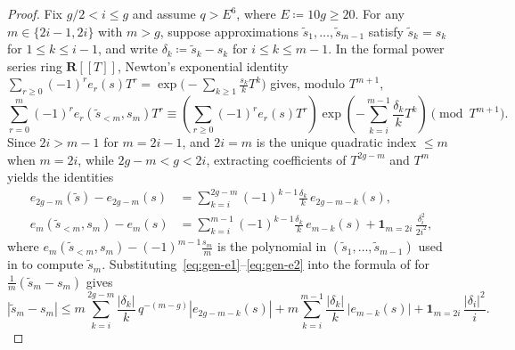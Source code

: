 \documentclass[11pt]{amsart}
\theoremstyle{remark}
\newcommand{\R}{\mathbf{R}}
\begin{document}
\begin{proof}
Fix $g/2 < i \le g$ and assume $q > E^6$, where $E \coloneqq 10g \ge 20$. For any $m \in \{2i - 1, 2i\}$ with $m > g$, suppose approximations $\tilde{s}_1, \dots, \tilde{s}_{m-1}$ satisfy $\tilde{s}_k = s_k$ for $1 \le k \le i - 1$, and write $\delta_k \coloneqq \tilde{s}_k - s_k$ for $i \le k \le m - 1$. In the formal power series ring $\R[[T]]$, Newton's exponential identity $\sum_{r \ge 0} (-1)^r e_r(s) T^r = \exp\bigl(-\sum_{k \ge 1} \frac{s_k}{k} T^k\bigr)$ gives, modulo $T^{m+1}$,
\[
\sum_{r=0}^m (-1)^r e_r(\tilde{s}_{<m}, s_m) T^r \equiv \left(\sum_{r \ge 0} (-1)^r e_r(s) T^r\right) \exp\!\left(-\sum_{k=i}^{m-1} \frac{\delta_k}{k} T^k\right) \pmod{T^{m+1}}.
\]
Since $2i > m - 1$ for $m = 2i - 1$, and $2i = m$ is the unique quadratic index $\le m$ when $m = 2i$, while $2g - m < g < 2i$, extracting coefficients of $T^{2g - m}$ and $T^m$ yields the identities
\begin{align}
e_{2g-m}(\tilde{s}) - e_{2g-m}(s) &= \sum_{k=i}^{2g-m} (-1)^{k-1} \frac{\delta_k}{k}\, e_{2g-m-k}(s), \label{eq:gen-e1}\\
e_m(\tilde{s}_{<m}, s_m) - e_m(s) &= \sum_{k=i}^{m-1} (-1)^{k-1} \frac{\delta_k}{k}\, e_{m-k}(s) + \mathbf{1}_{m=2i}\, \frac{\delta_i^2}{2 i^2}, \label{eq:gen-e2}
\end{align}
where $e_m(\tilde{s}_{<m}, s_m) - (-1)^{m-1} \frac{s_m}{m}$ is the polynomial in $(\tilde{s}_1, \dots, \tilde{s}_{m-1})$ used in \cite[Lemma~5.1]{CK26} to compute $\tilde{s}_m$. Substituting~\eqref{eq:gen-e1}--\eqref{eq:gen-e2} into the formula of \cite[Lemma~5.1]{CK26} for $\frac{1}{m}(\tilde{s}_m - s_m)$ gives
\begin{equation}\label{eq:sm-err}
|\tilde{s}_m - s_m| \le m \sum_{k=i}^{2g-m} \frac{|\delta_k|}{k}\, q^{-(m-g)} |e_{2g-m-k}(s)| + m \sum_{k=i}^{m-1} \frac{|\delta_k|}{k}\, |e_{m-k}(s)| + \mathbf{1}_{m=2i}\, \frac{|\delta_i|^2}{i}.
\end{equation}


\end{proof}
\end{document}
